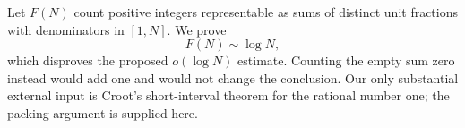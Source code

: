 Let $F(N)$ count positive integers representable as sums of distinct unit fractions with denominators in $[1,N]$. We prove
\[
 F(N)\sim\log N,
\]
which disproves the proposed $o(\log N)$ estimate. Counting the empty sum zero instead would add one and would not change the conclusion. Our only substantial external input is Croot's short-interval theorem for the rational number one; the packing argument is supplied here.
